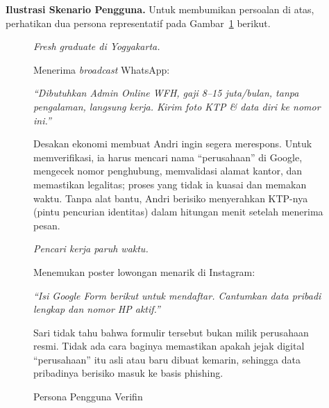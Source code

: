 \documentclass[12pt,a4paper]{article}
\begin{document}
\vspace{0.1cm}
\textbf{Ilustrasi Skenario Pengguna.} Untuk membumikan persoalan di atas, perhatikan dua persona
representatif pada Gambar~\ref{fig:persona} berikut.

\begin{figure}[H]
\centering
\begin{tcbraster}[raster columns=2, raster equal height=rows, raster column skip=4mm,
  enhanced, colback=verfinblue!4, colframe=verfinblue!55, colbacktitle=verfinblue!85,
  coltitle=white, fonttitle=\bfseries\footnotesize, left=2mm, right=2mm, top=1.2mm,
  bottom=1.2mm, boxrule=0.6pt, arc=1.5mm, title filled]
\begin{tcolorbox}[title={Persona 1 \,\textbullet\, Andri (22)}]
\footnotesize
\textit{Fresh graduate di Yogyakarta.}
\smallskip

Menerima \textit{broadcast} WhatsApp:
\begin{tcolorbox}[colback=white, colframe=verfinblue!25, boxrule=0.4pt, arc=1mm,
  left=1.5mm, right=1.5mm, top=0.8mm, bottom=0.8mm]
\itshape\footnotesize ``Dibutuhkan Admin Online WFH, gaji 8--15 juta/bulan, tanpa pengalaman,
langsung kerja. Kirim foto KTP \& data diri ke nomor ini.''
\end{tcolorbox}
Desakan ekonomi membuat Andri ingin segera merespons. Untuk memverifikasi, ia harus mencari nama
``perusahaan'' di Google, mengecek nomor penghubung, memvalidasi alamat kantor, dan memastikan
legalitas; proses yang tidak ia kuasai dan memakan waktu. Tanpa alat bantu, Andri berisiko
menyerahkan KTP-nya (pintu pencurian identitas) dalam hitungan menit setelah menerima pesan.
\end{tcolorbox}
\begin{tcolorbox}[title={Persona 2 \,\textbullet\, Sari (27)}]
\footnotesize
\textit{Pencari kerja paruh waktu.}
\smallskip

Menemukan poster lowongan menarik di Instagram:
\begin{tcolorbox}[colback=white, colframe=verfinblue!25, boxrule=0.4pt, arc=1mm,
  left=1.2mm, right=1.2mm, top=0.8mm, bottom=0.8mm]
\raggedright\itshape\footnotesize ``Isi Google Form berikut untuk mendaftar. Cantumkan data pribadi lengkap
dan nomor HP aktif.''
\end{tcolorbox}
Sari tidak tahu bahwa formulir tersebut bukan milik perusahaan resmi. Tidak ada cara baginya
memastikan apakah jejak digital ``perusahaan'' itu asli atau baru dibuat kemarin, sehingga data
pribadinya berisiko masuk ke basis phishing.
\end{tcolorbox}
\end{tcbraster}
  \caption{Persona Pengguna Verifin}
  \label{fig:persona}
\end{figure}
\end{document}
